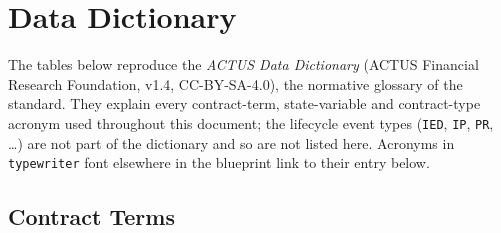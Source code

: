 \section{Data Dictionary}\label{sec:dict}

The tables below reproduce the \emph{ACTUS Data Dictionary} (ACTUS Financial Research Foundation, v1.4, CC-BY-SA-4.0), the normative glossary of the standard.  They explain every contract-term, state-variable and contract-type acronym used throughout this document; the lifecycle event types (\texttt{IED}, \texttt{IP}, \texttt{PR}, \dots) are not part of the dictionary and so are not listed here.  Acronyms in \texttt{typewriter} font elsewhere in the blueprint link to their entry below.

\subsection{Contract Terms}

